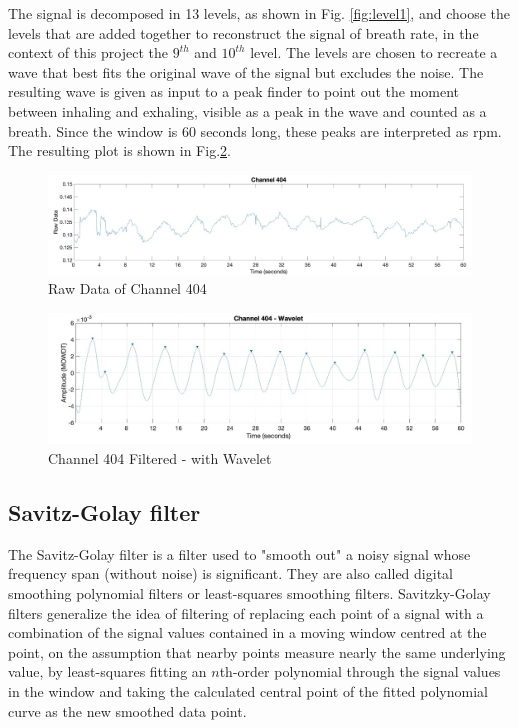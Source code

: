 The signal is decomposed in 13 levels, as shown in Fig. \ref{fig:level1}, and choose the levels that are added together to reconstruct the signal of breath rate, in the context of this project the $9^{th}$ and $10^{th}$ level. The levels are chosen to recreate a wave that best fits the original wave of the signal but excludes the noise.
The resulting wave is given as input to a peak finder to point out the moment between inhaling and exhaling, visible as a peak in the wave and counted as a breath. Since the window is 60 seconds long, these peaks are interpreted as rpm. The resulting plot is shown in Fig.\ref{fig:404Filt}.
\begin{figure}[H]
    \centering
    \includegraphics[width=\textwidth]{img/404.jpg}
    \caption{Raw Data of Channel 404}
    \label{fig:404}
\end{figure}

\begin{figure}[H]
    \centering
    \includegraphics[width=\textwidth]{img/404_wave.jpg}
    \caption{Channel 404 Filtered - with Wavelet}
    \label{fig:404Filt}
\end{figure}


\subsection{Savitz-Golay filter} \label{sg}


The Savitz-Golay filter is a filter used to "smooth out" a noisy signal whose frequency span (without noise) is significant. 
They are also called digital smoothing polynomial filters or least-squares smoothing filters. 
Savitzky-Golay filters generalize the idea of filtering of replacing each point of a signal with a combination of the signal values contained in a moving window centred at the point, on the assumption that nearby points measure nearly the same underlying value, by least-squares fitting an $n$th-order polynomial through the signal values in the window and taking the calculated central point of the fitted polynomial curve as the new smoothed data point.

